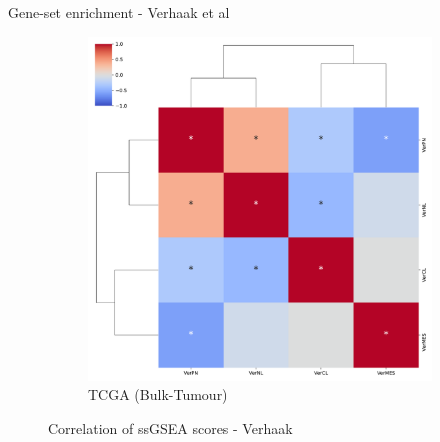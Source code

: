 \documentclass[aspectratio=169,9pt]{beamer}
\begin{document}
\begin{frame}{Gene-set enrichment - Verhaak et al}
\begin{adjustwidth}{-5cm}{-5cm}
\begin{figure}
\begin{subfigure}[c]{0.48\textwidth}
                    \includegraphics[width=\textwidth]{GSEA_TCGA_corrplot_Ver}
                    \caption{TCGA (Bulk-Tumour)}
                \end{subfigure}
                \caption{Correlation of ssGSEA scores - Verhaak}
            \end{figure}
        \end{adjustwidth}
    \end{frame}
\end{document}
